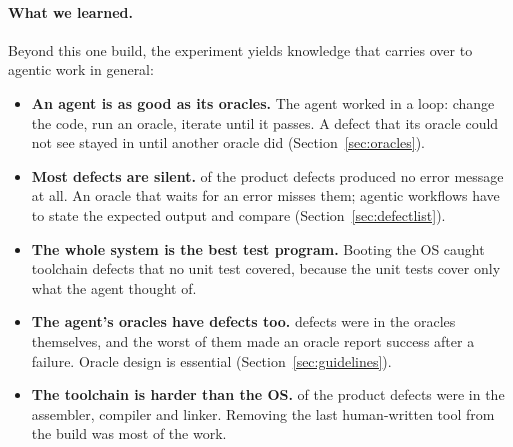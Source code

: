 \documentclass{article}
\begin{document}
\paragraph{What we learned.} Beyond this one build, the experiment yields knowledge that
carries over to agentic work in general:
\begin{itemize}
  \item \textbf{An agent is as good as its oracles.} The agent worked in a loop: change
        the code, run an oracle, iterate until it passes. A defect that its oracle could not
        see stayed in until another oracle did (Section~\ref{sec:oracles}).
  \item \textbf{Most defects are silent.} \ntsilent{} of the \ntproduct{} product defects
        produced no error message at all. An oracle that waits for an error misses them; agentic workflows
        have to state the expected output and compare (Section~\ref{sec:defectlist}).
  \item \textbf{The whole system is the best test program.} Booting the OS caught
        toolchain defects that no unit test covered, because the unit tests cover only what
        the agent thought of.
  \item \textbf{The agent's oracles have defects too.} \ntoracle{} defects were in the
        oracles themselves, and the worst of them made an oracle report success after a
        failure. Oracle design is essential (Section~\ref{sec:guidelines}).
  \item \textbf{The toolchain is harder than the OS.} \nttoolchain{} of the \ntproduct{}
        product defects were in the assembler, compiler and linker. Removing the last
        human-written tool from the build was most of the work.
\end{itemize}
\end{document}
